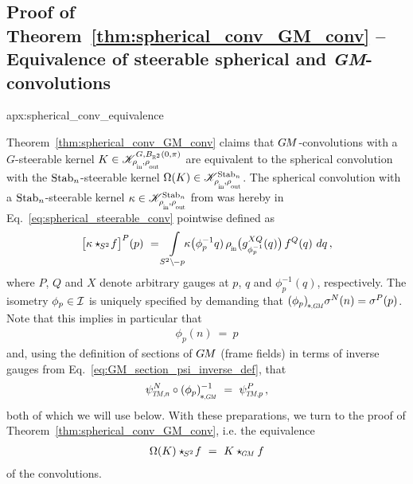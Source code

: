 \toclesslab\subsection{Proof of Theorem~\ref{thm:spherical_conv_GM_conv} -- Equivalence of steerable spherical and \textit{GM}-convolutions}{apx:spherical_conv_equivalence}


Theorem~\ref{thm:spherical_conv_GM_conv} claims that $G\mkern-1.4muM$-convolutions with a $G$-steerable kernel $K \in \mathscr{K}^{G,B_{\R^2}(0,\pi)}_{\rhoin\mkern-1mu,\rhoout}$ are equivalent to the spherical convolution with the $\operatorname{Stab}_{n}$-steerable kernel $\Omega(K) \in \mathscr{K}^{\Stab{n}}_{\rhoin\mkern-1mu,\rhoout}$.
The spherical convolution with a $\operatorname{Stab}_{n}$-steerable kernel $\kappa \in \mathscr{K}^{\Stab{n}}_{\rhoin\mkern-1mu,\rhoout}$ from \citet{Cohen2018-intertwiners,Cohen2019-generaltheory} was hereby in Eq.~\eqref{eq:spherical_steerable_conv} pointwise defined as
\begin{align}
    \big[\kappa \star_{\mkern-2mu S^2}\! f\big]^P(p)
    \ = \int\limits_{S^2 \backslash \mkern-2mu -p} \mkern-8mu \kappa\big(\phi_p^{-1}q)\, \rhoin\big( g_{\phi_p^{-1}}^{XQ}(q) \big)\, f^Q(q)\ dq \,,
\end{align}
where $P$, $Q$ and $X$ denote arbitrary gauges at $p$, $q$ and $\phi_p^{-1}(q)$, respectively.
The isometry $\phi_p \in \mathcal{I}$ is uniquely specified by demanding that $\dphipGM \sigma^N(n) = \sigma^P(p)$.
Note that this implies in particular that
\begin{align}\label{eq:phipn_sphere_action}
    \phi_p(n) \ =\ p
\end{align}
and, using the definition of sections of $G\mkern-1.4muM$ (frame fields) in terms of inverse gauges from Eq.~\eqref{eq:GM_section_psi_inverse_def}, that
\begin{align}\label{eq:phipn_gauges}
    \psiTMn^N \circ \dphipGM^{-1} \ =\ \psiTMp^P \,,
\end{align}
both of which we will use below.
With these preparations, we turn to the proof of Theorem~\ref{thm:spherical_conv_GM_conv}, i.e. the equivalence
\begin{align}
    \Omega(K) \star_{\mkern-2mu S^2}\! f\ =\ K \star_{\mkern-1mu\scalebox{.64}{$\GM$}} f
\end{align}
of the convolutions.


